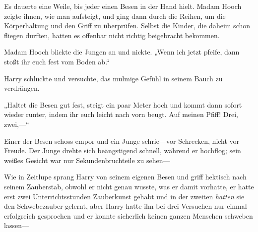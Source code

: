 Es dauerte eine Weile, bis jeder einen Besen in der Hand hielt. Madam Hooch zeigte ihnen, wie man aufsteigt, und ging dann durch die Reihen, um die Körperhaltung und den Griff zu überprüfen. Selbst die Kinder, die daheim schon fliegen durften, hatten es offenbar nicht richtig beigebracht bekommen.

Madam Hooch blickte die Jungen an und nickte. „Wenn ich jetzt pfeife, dann stoßt ihr euch fest vom Boden ab.“

Harry schluckte und versuchte, das mulmige Gefühl in seinem Bauch zu verdrängen.

„Haltet die Besen gut fest, steigt ein paar Meter hoch und kommt dann sofort wieder runter, indem ihr euch leicht nach vorn beugt. Auf meinen Pfiff! Drei, zwei,—“

Einer der Besen schoss empor und ein Junge schrie—vor Schrecken, nicht vor Freude. Der Junge drehte sich beängstigend schnell, während er hochflog; sein weißes Gesicht war nur Sekundenbruchteile zu sehen—

Wie in Zeitlupe sprang Harry von seinem eigenen Besen und griff hektisch nach seinem Zauberstab, obwohl er nicht genau wusste, was er damit vorhatte, er hatte erst zwei Unterrichtsstunden Zauberkunst gehabt und in der zweiten \emph{hatten} sie den Schwebezauber gelernt, aber Harry hatte ihn bei drei Versuchen nur einmal erfolgreich gesprochen und er konnte sicherlich keinen ganzen Menschen schweben lassen—

